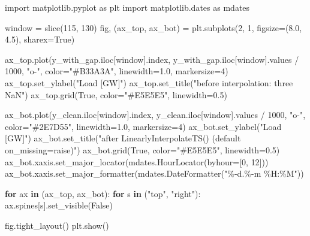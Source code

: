 \documentclass[
  english,
  letterpaper,
]{scrbook}
\newenvironment{Shaded}{\begin{snugshade}}{\end{snugshade}}
\newcommand{\BuiltInTok}[1]{\textcolor[rgb]{0.00,0.23,0.31}{#1}}
\newcommand{\ControlFlowTok}[1]{\textcolor[rgb]{0.00,0.23,0.31}{\textbf{#1}}}
\newcommand{\DecValTok}[1]{\textcolor[rgb]{0.68,0.00,0.00}{#1}}
\newcommand{\FloatTok}[1]{\textcolor[rgb]{0.68,0.00,0.00}{#1}}
\newcommand{\ImportTok}[1]{\textcolor[rgb]{0.00,0.46,0.62}{#1}}
\newcommand{\KeywordTok}[1]{\textcolor[rgb]{0.00,0.23,0.31}{\textbf{#1}}}
\newcommand{\NormalTok}[1]{\textcolor[rgb]{0.00,0.23,0.31}{#1}}
\newcommand{\OperatorTok}[1]{\textcolor[rgb]{0.37,0.37,0.37}{#1}}
\newcommand{\SpecialCharTok}[1]{\textcolor[rgb]{0.37,0.37,0.37}{#1}}
\newcommand{\StringTok}[1]{\textcolor[rgb]{0.13,0.47,0.30}{#1}}
\newcommand{\VariableTok}[1]{\textcolor[rgb]{0.07,0.07,0.07}{#1}}
\begin{document}
\begin{Shaded}
\begin{Highlighting}[]
\ImportTok{import}\NormalTok{ matplotlib.pyplot }\ImportTok{as}\NormalTok{ plt}
\ImportTok{import}\NormalTok{ matplotlib.dates }\ImportTok{as}\NormalTok{ mdates}

\NormalTok{window }\OperatorTok{=} \BuiltInTok{slice}\NormalTok{(}\DecValTok{115}\NormalTok{, }\DecValTok{130}\NormalTok{)}
\NormalTok{fig, (ax\_top, ax\_bot) }\OperatorTok{=}\NormalTok{ plt.subplots(}\DecValTok{2}\NormalTok{, }\DecValTok{1}\NormalTok{, figsize}\OperatorTok{=}\NormalTok{(}\FloatTok{8.0}\NormalTok{, }\FloatTok{4.5}\NormalTok{), sharex}\OperatorTok{=}\VariableTok{True}\NormalTok{)}

\NormalTok{ax\_top.plot(y\_with\_gap.iloc[window].index, y\_with\_gap.iloc[window].values }\OperatorTok{/} \DecValTok{1000}\NormalTok{,}
            \StringTok{"o{-}"}\NormalTok{, color}\OperatorTok{=}\StringTok{"\#B33A3A"}\NormalTok{, linewidth}\OperatorTok{=}\FloatTok{1.0}\NormalTok{, markersize}\OperatorTok{=}\DecValTok{4}\NormalTok{)}
\NormalTok{ax\_top.set\_ylabel(}\StringTok{"Load [GW]"}\NormalTok{)}
\NormalTok{ax\_top.set\_title(}\StringTok{"before interpolation: three NaN"}\NormalTok{)}
\NormalTok{ax\_top.grid(}\VariableTok{True}\NormalTok{, color}\OperatorTok{=}\StringTok{"\#E5E5E5"}\NormalTok{, linewidth}\OperatorTok{=}\FloatTok{0.5}\NormalTok{)}

\NormalTok{ax\_bot.plot(y\_clean.iloc[window].index, y\_clean.iloc[window].values }\OperatorTok{/} \DecValTok{1000}\NormalTok{,}
            \StringTok{"o{-}"}\NormalTok{, color}\OperatorTok{=}\StringTok{"\#2E7D55"}\NormalTok{, linewidth}\OperatorTok{=}\FloatTok{1.0}\NormalTok{, markersize}\OperatorTok{=}\DecValTok{4}\NormalTok{)}
\NormalTok{ax\_bot.set\_ylabel(}\StringTok{"Load [GW]"}\NormalTok{)}
\NormalTok{ax\_bot.set\_title(}\StringTok{"after \textasciigrave{}LinearlyInterpolateTS()\textasciigrave{} (default \textasciigrave{}on\_missing=\textquotesingle{}raise\textquotesingle{}\textasciigrave{})"}\NormalTok{)}
\NormalTok{ax\_bot.grid(}\VariableTok{True}\NormalTok{, color}\OperatorTok{=}\StringTok{"\#E5E5E5"}\NormalTok{, linewidth}\OperatorTok{=}\FloatTok{0.5}\NormalTok{)}
\NormalTok{ax\_bot.xaxis.set\_major\_locator(mdates.HourLocator(byhour}\OperatorTok{=}\NormalTok{[}\DecValTok{0}\NormalTok{, }\DecValTok{12}\NormalTok{]))}
\NormalTok{ax\_bot.xaxis.set\_major\_formatter(mdates.DateFormatter(}\StringTok{"}\SpecialCharTok{\%{-}d}\StringTok{.\%{-}m \%H:\%M"}\NormalTok{))}

\ControlFlowTok{for}\NormalTok{ ax }\KeywordTok{in}\NormalTok{ (ax\_top, ax\_bot):}
    \ControlFlowTok{for}\NormalTok{ s }\KeywordTok{in}\NormalTok{ (}\StringTok{"top"}\NormalTok{, }\StringTok{"right"}\NormalTok{):}
\NormalTok{        ax.spines[s].set\_visible(}\VariableTok{False}\NormalTok{)}

\NormalTok{fig.tight\_layout()}
\NormalTok{plt.show()}
\end{Highlighting}
\end{Shaded}
\end{document}
